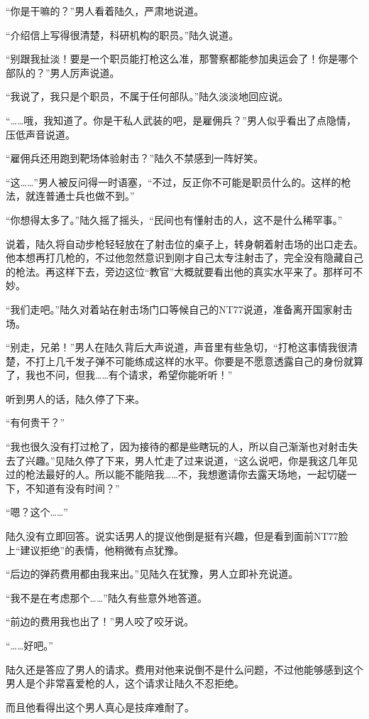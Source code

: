 “你是干嘛的？”男人看着陆久，严肃地说道。

“介绍信上写得很清楚，科研机构的职员。”陆久说道。

“别跟我扯淡！要是一个职员能打枪这么准，那警察都能参加奥运会了！你是哪个部队的？”男人厉声说道。

“我说了，我只是个职员，不属于任何部队。”陆久淡淡地回应说。

“……哦，我知道了。你是干私人武装的吧，是雇佣兵？”男人似乎看出了点隐情，压低声音说道。

“雇佣兵还用跑到靶场体验射击？”陆久不禁感到一阵好笑。

“这……”男人被反问得一时语塞，“不过，反正你不可能是职员什么的。这样的枪法，就连普通士兵也做不到。”

“你想得太多了。”陆久摇了摇头，“民间也有懂射击的人，这不是什么稀罕事。” 

说着，陆久将自动步枪轻轻放在了射击位的桌子上，转身朝着射击场的出口走去。他本想再打几枪的，不过他忽然意识到刚才自己太专注射击了，完全没有隐藏自己的枪法。再这样下去，旁边这位“教官”大概就要看出他的真实水平来了。那样可不妙。

“我们走吧。”陆久对着站在射击场门口等候自己的NT77说道，准备离开国家射击场。

“别走，兄弟！”男人在陆久背后大声说道，声音里有些急切，“打枪这事情我很清楚，不打上几千发子弹不可能练成这样的水平。你要是不愿意透露自己的身份就算了，我也不问，但我……有个请求，希望你能听听！”

听到男人的话，陆久停了下来。

“有何贵干？”

“我也很久没有打过枪了，因为接待的都是些瞎玩的人，所以自己渐渐也对射击失去了兴趣。”见陆久停了下来，男人忙走了过来说道，“这么说吧，你是我这几年见过的枪法最好的人。所以能不能陪我……不，我想邀请你去露天场地，一起切磋一下，不知道有没有时间？”

“嗯？这个……”

陆久没有立即回答。说实话男人的提议他倒是挺有兴趣，但是看到面前NT77脸上“建议拒绝”的表情，他稍微有点犹豫。

“后边的弹药费用都由我来出。”见陆久在犹豫，男人立即补充说道。

“我不是在考虑那个……”陆久有些意外地答道。

“前边的费用我也出了！”男人咬了咬牙说。

“……好吧。”

陆久还是答应了男人的请求。费用对他来说倒不是什么问题，不过他能够感到这个男人是个非常喜爱枪的人，这个请求让陆久不忍拒绝。

而且他看得出这个男人真心是技痒难耐了。

